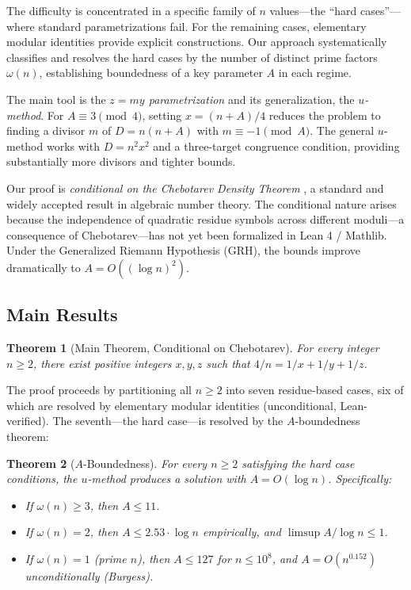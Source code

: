 \documentclass[11pt,a4paper]{article}
\theoremstyle{plain}
\newtheorem{theorem}{Theorem}[section]
\theoremstyle{plain}
\theoremstyle{definition}
\numberwithin{equation}{section}
\begin{document}
The difficulty is concentrated in a specific family of $n$ values---the ``hard cases''---where standard parametrizations fail. For the remaining cases, elementary modular identities provide explicit constructions. Our approach systematically classifies and resolves the hard cases by the number of distinct prime factors $\omega(n)$, establishing boundedness of a key parameter $A$ in each regime.

The main tool is the \emph{$z = my$ parametrization} and its generalization, the \emph{$u$-method}. For $A \equiv 3 \pmod{4}$, setting $x = (n+A)/4$ reduces the problem to finding a divisor $m$ of $D = n(n+A)$ with $m \equiv -1 \pmod{A}$. The general $u$-method works with $D = n^2 x^2$ and a three-target congruence condition, providing substantially more divisors and tighter bounds.

Our proof is \emph{conditional on the Chebotarev Density Theorem} \cite{Chebotarev1926}, a standard and widely accepted result in algebraic number theory. The conditional nature arises because the independence of quadratic residue symbols across different moduli---a consequence of Chebotarev---has not yet been formalized in Lean 4 / Mathlib. Under the Generalized Riemann Hypothesis (GRH), the bounds improve dramatically to $A = O((\log n)^2)$.

\subsection{Main Results}

\begin{theorem}[Main Theorem, Conditional on Chebotarev]\label{thm:main}
For every integer $n \geq 2$, there exist positive integers $x, y, z$ such that $4/n = 1/x + 1/y + 1/z$.
\end{theorem}

The proof proceeds by partitioning all $n \geq 2$ into seven residue-based cases, six of which are resolved by elementary modular identities (unconditional, Lean-verified). The seventh---the hard case---is resolved by the $A$-boundedness theorem:

\begin{theorem}[$A$-Boundedness]\label{thm:a-bounded}
For every $n \geq 2$ satisfying the hard case conditions, the $u$-method produces a solution with $A = O(\log n)$. Specifically:
\begin{itemize}[noitemsep]
  \item If $\omega(n) \geq 3$, then $A \leq 11$.
  \item If $\omega(n) = 2$, then $A \leq 2.53 \cdot \log n$ empirically, and $\limsup A/\log n \leq 1$.
  \item If $\omega(n) = 1$ (prime $n$), then $A \leq 127$ for $n \leq 10^8$, and $A = O(n^{0.152})$ unconditionally (Burgess).
\end{itemize}
\end{theorem}
\end{document}
